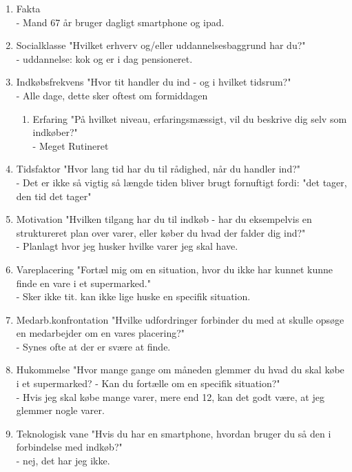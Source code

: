 \begin{enumerate}
\begin{enumerate}
\item Fakta\\
  - Mand 67 år bruger dagligt smartphone og ipad.
\item Socialklasse "Hvilket erhverv og/eller uddannelsesbaggrund har du?"\\
  - uddannelse: kok og er i dag pensioneret.
\item Indkøbsfrekvens "Hvor tit handler du ind - og i hvilket tidsrum?"\\
  - Alle dage, dette sker oftest om formiddagen
\begin{enumerate}
\item Erfaring	"På hvilket niveau, erfaringsmæssigt, vil du beskrive dig selv som indkøber?"\\
  - Meget Rutineret
\end{enumerate}
\item Tidsfaktor "Hvor lang tid har du til rådighed, når du handler ind?"\\
  - Det er ikke så vigtig så længde tiden bliver brugt fornuftigt fordi: "det tager, den tid det tager"
\item Motivation "Hvilken tilgang har du til indkøb - har du eksempelvis en struktureret plan over varer, eller køber du hvad der falder dig ind?"\\
  - Planlagt hvor jeg husker hvilke varer jeg skal have.
\item  Vareplacering "Fortæl mig om en situation, hvor du ikke har kunnet kunne finde en vare i et supermarked."\\
  - Sker ikke tit. kan ikke lige huske en specifik situation.
\item Medarb.konfrontation "Hvilke udfordringer forbinder du med at skulle opsøge en medarbejder om en vares placering?"\\
  - Synes ofte at der er svære at finde.
\item Hukommelse "Hvor mange gange om måneden glemmer du hvad du skal købe i et supermarked? - Kan du fortælle om en specifik situation?"\\
  - Hvis jeg skal købe mange varer, mere end 12, kan det godt være, at jeg glemmer nogle varer.
\item Teknologisk vane "Hvis du har en smartphone, hvordan bruger du så den i forbindelse med indkøb?"\\
  - nej, det har jeg ikke.


\end{enumerate}
\end{enumerate}
